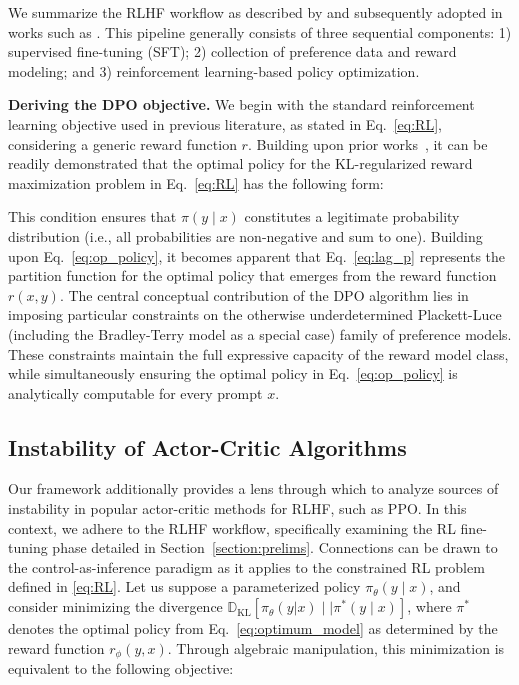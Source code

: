 We summarize the RLHF workflow as described by \citeauthor{ziegler2020finetuning} and subsequently adopted in works such as \citep{stiennon2022learning, bai2022training, ouyang2022training}. This pipeline generally consists of three sequential components: 1) supervised fine-tuning (SFT); 2) collection of preference data and reward modeling; and 3) reinforcement learning-based policy optimization.

\textbf{Deriving the DPO objective.} We begin with the standard reinforcement learning objective used in previous literature, as stated in Eq.~\ref{eq:RL}, considering a generic reward function $r$. Building upon prior works~\citep{peters2007reinforcement, peng2019advantage, korbak2022reinforcement, go2023aligning}, it can be readily demonstrated that the optimal policy for the KL-regularized reward maximization problem in Eq.~\ref{eq:RL} has the following form:

This condition ensures that $\pi(y\mid x)$ constitutes a legitimate probability distribution (i.e., all probabilities are non-negative and sum to one). Building upon Eq.~\ref{eq:op_policy}, it becomes apparent that Eq.~\ref{eq:lag_p} represents the partition function for the optimal policy that emerges from the reward function $r(x, y)$. The central conceptual contribution of the DPO algorithm lies in imposing particular constraints on the otherwise underdetermined Plackett-Luce (including the Bradley-Terry model as a special case) family of preference models. These constraints maintain the full expressive capacity of the reward model class, while simultaneously ensuring the optimal policy in Eq.~\ref{eq:op_policy} is analytically computable for every prompt $x$.

\subsection{Instability of Actor-Critic Algorithms} Our framework additionally provides a lens through which to analyze sources of instability in popular actor-critic methods for RLHF, such as PPO. In this context, we adhere to the RLHF workflow, specifically examining the RL fine-tuning phase detailed in Section~\ref{section:prelims}. Connections can be drawn to the control-as-inference paradigm \cite{levine2018reinforcement} as it applies to the constrained RL problem defined in \ref{eq:RL}. Let us suppose a parameterized policy $\pi_{\theta}(y\mid x)$, and consider minimizing the divergence $\mathbb{D}_{\text{KL}}[\pi_{\theta}(y|x) \mid\mid \pi^*(y\mid x)]$, where $\pi^*$ denotes the optimal policy from Eq.~\ref{eq:optimum_model} as determined by the reward function $r_{\phi}(y, x)$. Through algebraic manipulation, this minimization is equivalent to the following objective:

